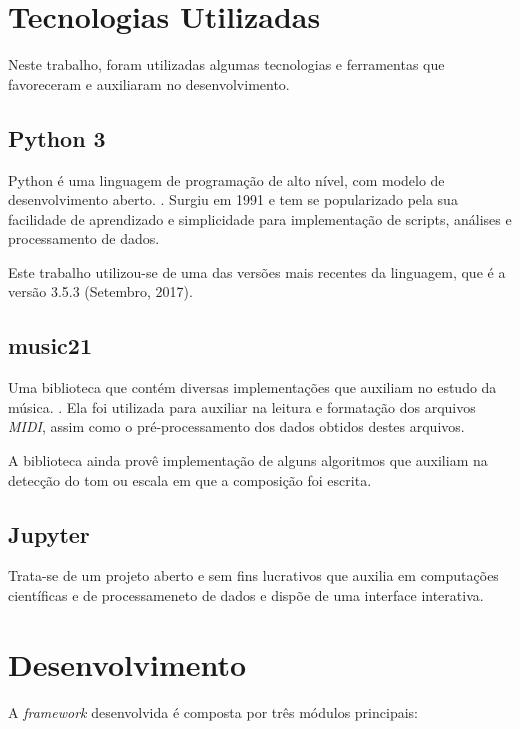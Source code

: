 \label{cap:analise}
\section{Tecnologias Utilizadas}

Neste trabalho, foram utilizadas algumas tecnologias e ferramentas que favoreceram e auxiliaram no desenvolvimento.

\subsection{Python 3}

Python é uma linguagem de programação de alto nível, com modelo de desenvolvimento aberto. \cite{python}. Surgiu em 1991 e tem se popularizado pela sua facilidade de aprendizado e simplicidade para implementação de scripts, análises e processamento de dados.

Este trabalho utilizou-se de uma das versões mais recentes da linguagem, que é a versão 3.5.3 (Setembro, 2017). 

\subsection{music21}

Uma biblioteca que contém diversas implementações que auxiliam no estudo da música. \cite{music21}.
Ela foi utilizada para auxiliar na leitura e formatação dos arquivos \textit{MIDI}, assim como o pré-processamento dos dados obtidos destes arquivos.

A biblioteca ainda provê implementação de alguns algoritmos que auxiliam na detecção do tom ou escala em que a composição foi escrita.

\subsection{Jupyter}

Trata-se de um projeto aberto e sem fins lucrativos que auxilia em computações científicas e de processameneto de dados e dispõe de uma interface interativa.


\section{Desenvolvimento}

A \textit{framework} desenvolvida é composta por três módulos principais:


